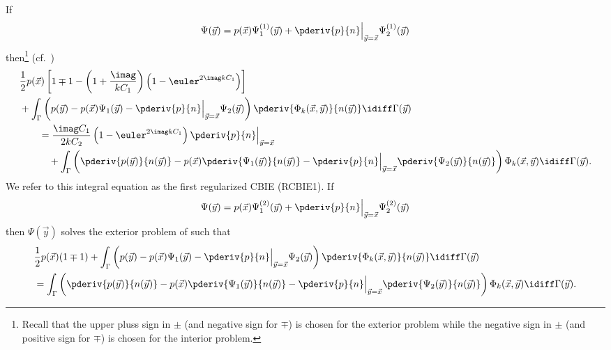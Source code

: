 If
\begin{equation*}
	\Psi(\vec{y}) = p(\vec{x})\Psi_1^{(1)}(\vec{y}) + \pderiv{p}{n}\Big\vert_{\vec{y}=\vec{x}}\Psi_2^{(1)}(\vec{y})
\end{equation*}
then\footnote{Recall that the upper pluss sign in $\pm$ (and negative sign for $\mp$) is chosen for the exterior problem while the negative sign in $\pm$ (and positive sign for $\mp$) is chosen for the interior problem.} (cf.~\cite{Sun2015bri})
\begin{equation}\label{Eq3:RCBIE1}
\begin{aligned}
	&\frac{1}{2}p(\vec{x})\left[1\mp 1 - \left(1+\frac{\imag}{kC_1}\right)\left(1-\euler^{2\imag kC_1}\right)\right] \\
	&+ \int_\Gamma \left(p(\vec{y}) - p(\vec{x})\Psi_1(\vec{y}) - \pderiv{p}{n}\Big\vert_{\vec{y}=\vec{x}}\Psi_2(\vec{y})\right)\pderiv{\Phi_k(\vec{x},\vec{y})}{n(\vec{y})}  \idiff\Gamma(\vec{y}) \\
	&{\hskip2em\relax}= \frac{\imag C_1}{2kC_2} \left(1-\euler^{2\imag kC_1}\right)\pderiv{p}{n}\Big\vert_{\vec{y}=\vec{x}}\\
	&{\hskip3em\relax}+  \int_\Gamma \left(\pderiv{p(\vec{y})}{n(\vec{y})} - p(\vec{x})\pderiv{\Psi_1(\vec{y})}{n(\vec{y})} - \pderiv{p}{n}\Big\vert_{\vec{y}=\vec{x}}\pderiv{\Psi_2(\vec{y})}{n(\vec{y})}\right)\Phi_k(\vec{x},\vec{y}) \idiff\Gamma(\vec{y}).
\end{aligned}
\end{equation}
We refer to this integral equation as the first regularized CBIE (RCBIE1). If
\begin{equation*}
	\Psi(\vec{y}) = p(\vec{x})\Psi_1^{(2)}(\vec{y}) + \pderiv{p}{n}\Big\vert_{\vec{y}=\vec{x}}\Psi_2^{(2)}(\vec{y})
\end{equation*}
then $\Psi(\vec{y})$ solves the exterior problem of  such that
\begin{equation}\label{Eq3:RCBIE2}
\begin{aligned}
	&\frac{1}{2}p(\vec{x})(1\mp 1) + \int_\Gamma \left(p(\vec{y}) - p(\vec{x})\Psi_1(\vec{y}) - \pderiv{p}{n}\Big\vert_{\vec{y}=\vec{x}}\Psi_2(\vec{y})\right)\pderiv{\Phi_k(\vec{x},\vec{y})}{n(\vec{y})}  \idiff\Gamma(\vec{y}) \\
	&= \int_\Gamma \left(\pderiv{p(\vec{y})}{n(\vec{y})} - p(\vec{x})\pderiv{\Psi_1(\vec{y})}{n(\vec{y})} - \pderiv{p}{n}\Big\vert_{\vec{y}=\vec{x}}\pderiv{\Psi_2(\vec{y})}{n(\vec{y})}\right)\Phi_k(\vec{x},\vec{y}) \idiff\Gamma(\vec{y}).
\end{aligned}
\end{equation}
